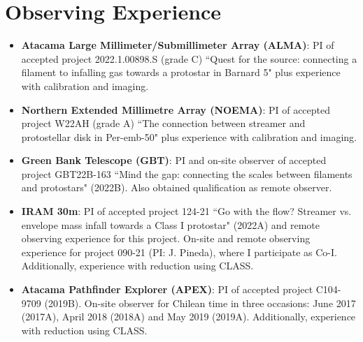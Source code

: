 \documentclass[11pt,a4paper,verdana]{moderncv} %
\begin{document}
\section{Observing Experience}
\begin{itemize}
 \item \textbf{Atacama Large Millimeter/Submillimeter Array (ALMA)}: PI of accepted project 2022.1.00898.S (grade C) ``Quest for the source: connecting a filament to infalling gas towards a protostar in Barnard 5" plus experience with calibration and imaging.
  \item \textbf{Northern Extended Millimetre Array (NOEMA)}: PI of accepted project W22AH (grade A) ``The connection between streamer and protostellar disk in Per-emb-50" plus experience with calibration and imaging.
 \item \textbf{Green Bank Telescope (GBT)}: PI and on-site observer of accepted project GBT22B-163 ``Mind the gap: connecting the scales between filaments and protostars" (2022B). Also obtained qualification as remote observer.
 \item \textbf{IRAM 30m}: PI of accepted project 124-21 ``Go with the flow? Streamer vs. envelope mass infall towards a Class I protostar" (2022A) and remote observing experience for this project. On-site and remote observing experience for project 090-21 (PI: J. Pineda), where I participate as Co-I. Additionally, experience with reduction using CLASS.
 \item \textbf{Atacama Pathfinder Explorer (APEX)}: PI of accepted project C104-9709 (2019B). On-site observer for Chilean time in three occasions: June 2017 (2017A), April 2018 (2018A) and May 2019 (2019A). Additionally, experience with reduction using CLASS.
\end{itemize}
\end{document}
